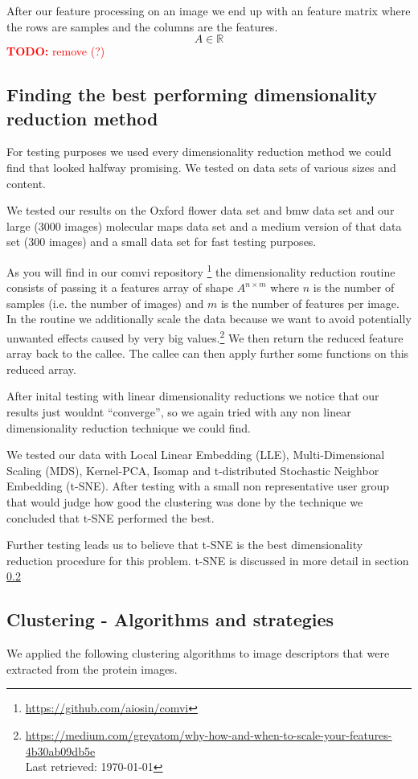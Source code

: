 \documentclass[journal]{vgtc}       %
\newcommand{\todo}[1]{\textcolor{red}{\textbf{TODO:} #1}}
\begin{document}
After our feature processing on an image we end up with an feature matrix where the rows are samples  and the columns are the features.  \[A \in \mathbb{R}\] \todo{remove (?) }


\subsection{Finding the best performing  dimensionality reduction method}\label{subsec:dimred}
For testing purposes we used every dimensionality reduction method we could find that looked halfway promising. We tested on data sets of various sizes and content.

We tested our results on the Oxford flower data set and bmw data set and our large (3000 images) molecular maps data set and a medium version of that data set (300 images) and a small data set for fast testing purposes.

As you will find in our comvi repository \footnote{\url{https://github.com/aiosin/comvi}} the dimensionality reduction routine consists of passing it a features array of shape \(A^{n\times m}\) where \(n\) is the number of samples (i.e. the number of images) and \(m\) is the number of features per image.
In the routine we additionally scale the data because we want to avoid potentially unwanted effects caused by very big values.\footnote{\url{https://medium.com/greyatom/why-how-and-when-to-scale-your-features-4b30ab09db5e} \\ Last retrieved: \today}
We then return the reduced feature array back to the callee. The callee can then apply further some functions on this reduced array.

After inital testing with linear dimensionality reductions we notice that our results just wouldnt ``converge'', so we again tried with any non linear dimensionality reduction technique we could find.

We tested our data with Local Linear Embedding (LLE), Multi-Dimensional Scaling (MDS), Kernel-PCA, Isomap and t-distributed Stochastic Neighbor Embedding (t-SNE).
After testing with a small non representative user group that would judge how good the clustering was done by the technique we concluded that t-SNE performed the best.

Further testing leads us to believe that t-SNE is the best dimensionality reduction procedure for this problem. t-SNE is discussed in more detail in section \ref{sec:clusteringa}


\subsection{Clustering - Algorithms and strategies }\label{sec:clusteringa}
We applied the following clustering algorithms to image descriptors that were extracted from the protein images.
\end{document}
